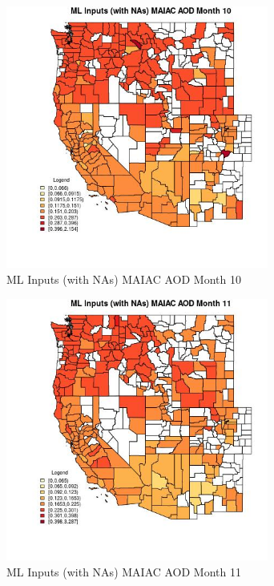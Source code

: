 \begin{figure} 
\centering  
\includegraphics[width=0.77\textwidth]{Code_Outputs/Report_ML_input_PM25_Step4_part_f_de_duplicated_aveswNAs_CountyMAIAC_AODmedianMonth10.jpg} 
\caption{\label{fig:Report_ML_input_PM25_Step4_part_f_de_duplicated_aveswNAsCountyMAIAC_AODmedianMonth10}ML Inputs (with NAs) MAIAC AOD Month 10} 
\end{figure} 
 

\begin{figure} 
\centering  
\includegraphics[width=0.77\textwidth]{Code_Outputs/Report_ML_input_PM25_Step4_part_f_de_duplicated_aveswNAs_CountyMAIAC_AODmedianMonth11.jpg} 
\caption{\label{fig:Report_ML_input_PM25_Step4_part_f_de_duplicated_aveswNAsCountyMAIAC_AODmedianMonth11}ML Inputs (with NAs) MAIAC AOD Month 11} 
\end{figure} 
 

